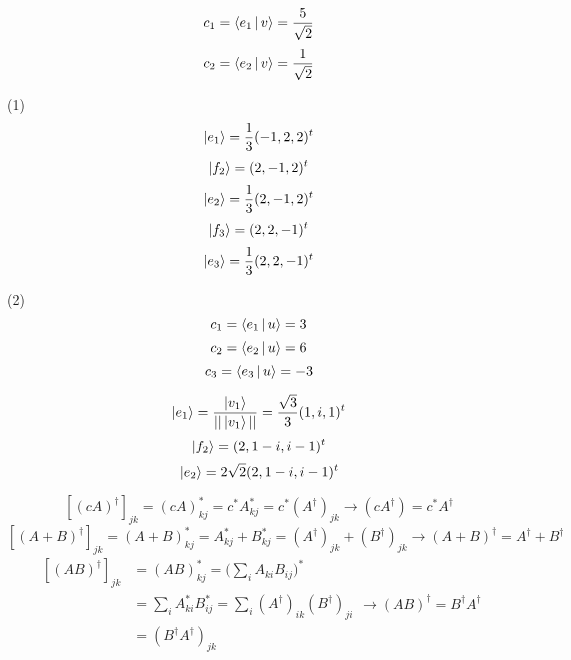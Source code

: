 \exercise
\[
c_1 = \Braket{e_1|v} = \frac{5}{\sqrt{2}}
\]
\[
c_2 = \Braket{e_2|v} = \frac{1}{\sqrt{2}}
\]

\exercise

(1)
\[
\ket{e_1} = \frac13 (-1, 2, 2)^t
\]
\[
\ket{f_2} = (2, -1, 2)^t
\]
\[
\ket{e_2} = \frac13 (2, -1, 2)^t
\]
\[
\ket{f_3} = (2, 2, -1)^t
\]
\[
\ket{e_3} = \frac13 (2, 2, -1)^t
\]

(2)
\[
c_1 = \Braket{e_1|u} = 3
\]
\[
c_2 = \Braket{e_2|u} = 6
\]
\[
c_3 = \Braket{e_3|u} = -3
\]

\exercise
\[
\ket{e_1} = \frac{\ket{v_1}}{||\ket{v_1}||} = \frac{\sqrt{3}}{3}(1,i,1)^t
\]
\[
\ket{f_2} = (2, 1-i, i-1)^t
\]
\[
\ket{e_2} = 2\sqrt{2}(2, 1-i, i-1)^t
\]

\exercise
\[
[(cA)^\dagger]_{jk} = (cA)_{kj}^* = c^* A_{kj}^* = c^* (A^\dagger)_{jk} \rightarrow (cA^\dagger) = c^* A^\dagger
\]
\[
[(A+B)^\dagger]_{jk} = (A+B)_{kj}^* = A_{kj}^* + B_{kj}^* = (A^\dagger)_{jk} + (B^\dagger)_{jk} \rightarrow (A+B)^\dagger = A^\dagger + B^\dagger
\]
\[
\begin{split}
[(AB)^\dagger]_{jk} &= (AB)_{kj}^* = \Big(\sum\limits_i A_{ki}B_{ij}\Big)^* \\
&= \sum\limits_i A_{ki}^*B_{ij}^* = \sum\limits_i (A^\dagger)_{ik}(B^\dagger)_{ji} \\
&= (B^\dagger A^\dagger)_{jk}
\end{split} \rightarrow (AB)^\dagger = B^\dagger A^\dagger
\]

